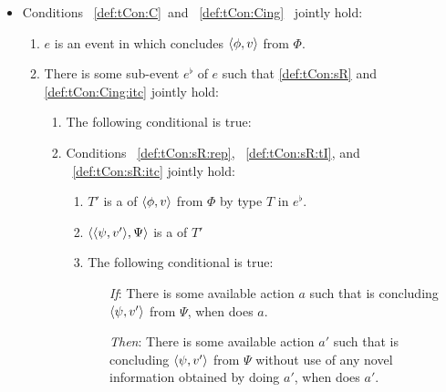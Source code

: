 \begin{note}
\begin{definition}
    \begin{itemize}
    \item
      Conditions~%
      \ref{def:tCon:C}~and~%
      \ref{def:tCon:Cing}~%
      jointly hold:
      \begin{enumerate}[label=\arabic*., ref=(\arabic*)]
      \item
        \label{def:tCon:C}
        \(e\) is an event in which \vAgent{} concludes \(\langle \phi, v \rangle\) from \(\Phi\).
      \item
        \label{def:tCon:Cing}
        There is some sub-event \(e^{\flat}\) of \(e\) such that \ref{def:tCon:sR} and \ref{def:tCon:Cing:itc} jointly hold:
        \begin{enumerate}[label=\alph*., ref=(\arabic{enumi}\alph*)]
        \item
          \label{def:tCon:Cing:itc}
          The following conditional is true:
        \item
          \label{def:tCon:sR}
          Conditions%
          ~\ref{def:tCon:sR:rep},%
          ~\ref{def:tCon:sR:tI}, and%
          ~\ref{def:tCon:sR:itc} %
          jointly hold:
          \begin{enumerate}[label=\roman*., ref=(\arabic{enumi}\alph{enumii}.\roman*)]
          \item
            \label{def:tCon:sR:rep}
            \(T'\) is a \tRep{} of \vAgent{} \tCV{} \(\langle \phi, v \rangle\) from \(\Phi\) by type \(T\) in \(e^{\flat}\).
          \item
            \label{def:tCon:sR:tI}
            \(\langle \langle \psi, v' \rangle, \Psi \rangle\) is a \tI{} of \(T'\)
          \item
            \label{def:tCon:sR:itc}
            The following conditional is true:
            \begin{itemize}
            \item[\emph{If}:]
              There is some available action \(a\) such that \vAgent{} is concluding \(\langle \psi, v' \rangle\) from \(\Psi\), when \vAgent{} does \(a\).
            \item[\emph{Then}:]
              There is some available action \(a'\) such that \vAgent{} is concluding \(\langle \psi, v' \rangle\) from \(\Psi\) without use of any novel information obtained by doing \(a'\), when \vAgent{} does \(a'\).
            \end{itemize}
          \end{enumerate}
        \end{enumerate}
      \end{enumerate}
    \end{itemize}
    \vspace{-1.5\baselineskip}
  \end{definition}


\end{note}
